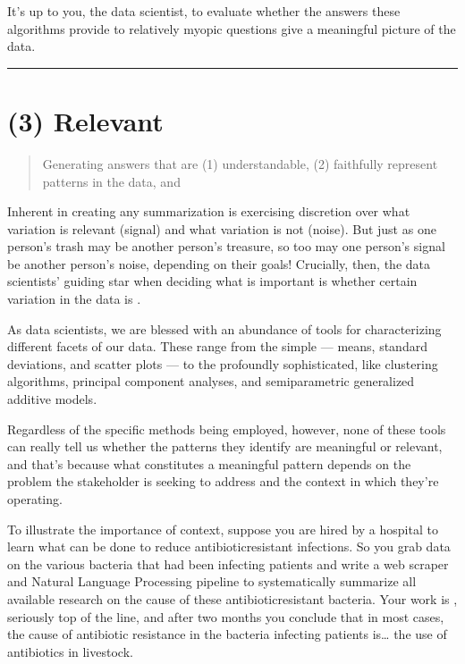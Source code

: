 \documentclass[letterpaper,10pt,english]{jupyterBook}
\begin{document}
\sphinxAtStartPar
It’s up to you, the data scientist, to evaluate whether the answers these algorithms provide to relatively myopic questions give a meaningful picture of the data.


\bigskip\hrule\bigskip


\sphinxstepscope


\section{(3) Relevant}
\label{\detokenize{30_questions/19_exploratory_internal_meaningful:relevant}}\label{\detokenize{30_questions/19_exploratory_internal_meaningful::doc}}\begin{quote}

\sphinxAtStartPar
Generating answers that are (1) understandable, (2) faithfully represent patterns in the data, and 
\end{quote}

\sphinxAtStartPar
Inherent in creating any summarization is exercising discretion over what variation is relevant (signal) and what variation is not (noise). But just as one person’s trash may be another person’s treasure, so too may one person’s signal be another person’s noise, depending on their goals! Crucially, then, the data scientists’ guiding star when deciding what is important is whether certain variation in the data is .

\sphinxAtStartPar
As data scientists, we are blessed with an abundance of tools for characterizing different facets of our data. These range from the simple — means, standard deviations, and scatter plots — to the profoundly sophisticated, like clustering algorithms, principal component analyses, and semi\sphinxhyphen{}parametric generalized additive models.

\sphinxAtStartPar
Regardless of the specific methods being employed, however, none of these tools can really tell us whether the patterns they identify are meaningful or relevant, and that’s because what constitutes a meaningful pattern depends on the problem the stakeholder is seeking to address and the context in which they’re operating.

\sphinxAtStartPar
To illustrate the importance of context, suppose you are hired by a hospital to learn what can be done to reduce antibiotic\sphinxhyphen{}resistant infections. So you grab data on the various bacteria that had been infecting patients and write a web scraper and Natural Language Processing pipeline to systematically summarize all available research on the cause of these antibiotic\sphinxhyphen{}resistant bacteria. Your work is , seriously top of the line, and after two months you conclude that in most cases, the cause of antibiotic resistance in the bacteria infecting patients is… the use of antibiotics in livestock.
\end{document}
